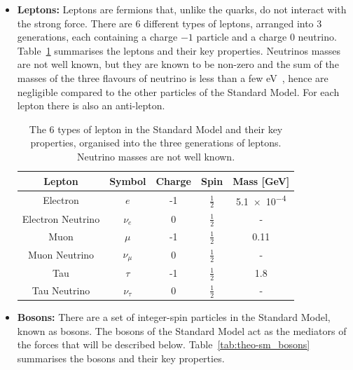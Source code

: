 \begin{itemize}[leftmargin=*]
\item\textbf{Leptons:}
  Leptons are fermions that, unlike the quarks, do not interact with the strong force.
  There are 6 different types of leptons,
  arranged into  3 generations, each containing a charge $-1$ particle and a charge 0 neutrino.
  Table~\ref{tab:theo-sm_leptons} summarises the leptons and their key properties.
  Neutrinos masses are not well known, but they are known to be non-zero
  and the sum of the masses of the three flavours of neutrino is less than a few eV~\cite{theo-nu_mass},
  hence are negligible compared to the other particles of the Standard Model.
  For each lepton there is also an anti-lepton.
  
  {\renewcommand{\arraystretch}{1.5}
  \begin{table}[!ht]
  \begin{center}
    \begin{tabular}{|c||c|c|c|c|}
      \hline
    Lepton            & Symbol        & Charge  &  Spin           &  Mass [GeV]\\
    \hline
    Electron          &   $e$         &  -1    &  $\frac{1}{2}$   &  \num{5.1e-4}\\
    Electron Neutrino &   $\nu_e$     &  0     &  $\frac{1}{2}$   &  -\\
    \hline                                   
    Muon              &   $\mu$       &  -1    &  $\frac{1}{2}$   &  0.11 \\
    Muon Neutrino     &   $\nu_{\mu}$  &  0     &  $\frac{1}{2}$   &  -\\
    \hline                                      
    Tau               &   $\tau$       &  -1   &  $\frac{1}{2}$   &  1.8\\
    Tau Neutrino      &   $\nu_{\tau}$  &  0    &  $\frac{1}{2}$   &  -\\
    \hline  
  \end{tabular}
    \caption{The 6 types of lepton in the Standard Model and their key properties,
    organised into the three generations of leptons. Neutrino masses are not well known. }
  \label{tab:theo-sm_leptons}
  \end{center}
  \end{table}}
 
\item\textbf{Bosons:}
  There are a set of integer-spin particles in the Standard Model, known as bosons.
  The bosons of the Standard Model act as the mediators of the forces that will be described below.
  Table~\ref{tab:theo-sm_bosons} summarises the bosons and their key properties.


\end{itemize}
